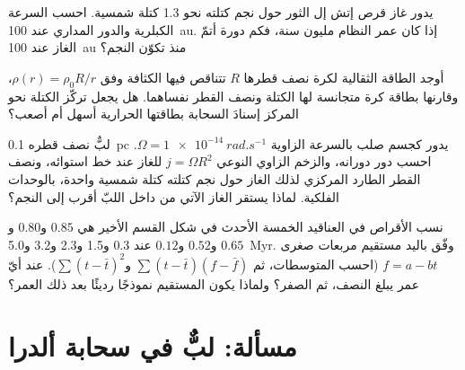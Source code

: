 \begin{exercise}[$\star\star$]\label{exo:b2:ism-star-formation:9}
يدور غاز قرص إتش إل الثور حول نجم كتلته نحو \num{1.3} كتلة
شمسية. احسب السرعة الكبلرية والدور المداري عند \qty{100}{au}.
إذا كان عمر النظام مليون سنة، فكم دورة أتمّ الغاز عند
\qty{100}{au} منذ تكوّن النجم؟
\end{exercise}

\begin{exercise}[$\star\star\star$]\label{exo:b2:ism-star-formation:10}
أوجد الطاقة الثقالية لكرة نصف قطرها $R$ تتناقص فيها الكثافة
وفق $\rho(r) = \rho_0 R/r$، وقارنها بطاقة كرة متجانسة لها
الكتلة ونصف القطر نفساهما. هل يجعل تركّز الكتلة نحو المركز
إسنادَ السحابة بطاقتها الحرارية أسهل أم أصعب؟
\end{exercise}

\begin{exercise}[$\star\star\star$]\label{exo:b2:ism-star-formation:11}
لبٌّ نصف قطره \qty{0.1}{pc} يدور كجسم صلب بالسرعة الزاوية
$\Omega = \qty{1e-14}{rad.s^{-1}}$. احسب دور دورانه، والزخم الزاوي النوعي
$j = \Omega R^2$ للغاز عند خط استوائه، ونصف القطر الطارد المركزي
لذلك الغاز حول نجم كتلته كتلة شمسية واحدة، بالوحدات الفلكية.
لماذا يستقر الغاز الآتي من داخل اللبّ أقرب إلى النجم؟
\end{exercise}

\begin{exercise}[$\star\star\star$]\label{exo:b2:ism-star-formation:12}
نسب الأقراص في العناقيد الخمسة الأحدث في شكل القسم
الأخير هي $0.85$ و$0.80$ و$0.65$ و$0.52$ و$0.12$ عند 0.3 و1.5 و2.3 و3.2
و\qty{5.0}{Myr}. وفّق باليد مستقيم مربعات صغرى $f = a - bt$
(احسب المتوسطات، ثم $\sum(t - \bar t)(f - \bar f)$
و$\sum(t - \bar t)^2$). عند أيّ عمر يبلغ النصف، ثم الصفر؟ ولماذا يكون
المستقيم نموذجًا رديئًا بعد ذلك العمر؟
\end{exercise}

\section{مسألة: لبٌّ في سحابة ألدرا}

